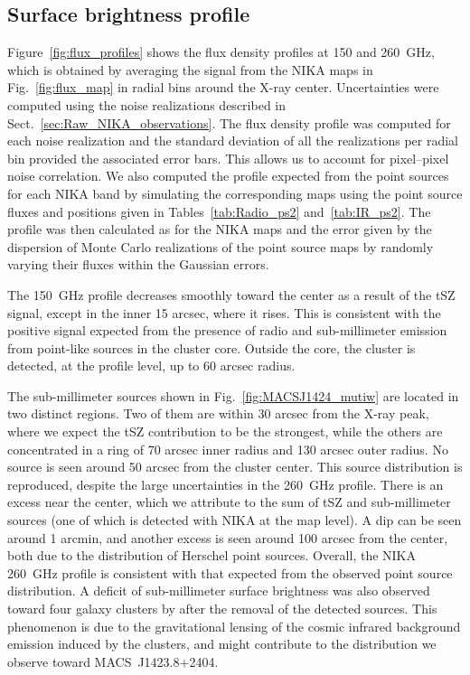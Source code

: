 \documentclass[traditabstract]{aa}
\begin{document}
\subsection{Surface brightness profile}\label{sec:surface_brightness_profiles_comparison}
Figure~\ref{fig:flux_profiles}  shows the flux density profiles at 150 and 260~GHz, which is obtained by averaging the signal from the NIKA maps in Fig.~\ref{fig:flux_map} in radial bins around the X-ray center. Uncertainties were computed  using the noise realizations described in Sect.~\ref{sec:Raw_NIKA_observations}. The flux density profile was computed for each noise realization and the standard deviation of all the realizations per radial bin provided the associated error bars. This allows us to account for pixel--pixel noise correlation. We also computed the profile expected from the point sources for each NIKA band by simulating the corresponding maps using the point source fluxes and positions given in Tables~\ref{tab:Radio_ps2} and~\ref{tab:IR_ps2}. The profile was then calculated as for the NIKA maps and the error given by the dispersion of Monte Carlo realizations of the point source maps by randomly varying their fluxes within the Gaussian errors.

The 150~GHz profile decreases smoothly toward the center as a result of the tSZ signal, except in the inner 15 arcsec, where it rises. This is consistent with the positive signal expected from the presence of radio and sub-millimeter emission from point-like sources in the cluster core. Outside the core, the cluster is detected, at the profile level, up to 60 arcsec radius. 

The sub-millimeter sources shown in Fig.~\ref{fig:MACSJ1424_mutiw} are located in two distinct regions. Two of them are within 30 arcsec from the X-ray peak, where we expect the tSZ contribution to be the strongest, while the others are concentrated in a ring of 70 arcsec inner radius and 130 arcsec outer radius. No source is seen around 50 arcsec from the cluster center. This source distribution is reproduced, despite the large uncertainties in the 260~GHz profile. There is an excess near the center, which we attribute to the sum of tSZ and sub-millimeter sources (one of  which is detected with NIKA at the map level). A dip can be  seen around 1 arcmin, and another excess is seen around 100 arcsec from the center, both due to the distribution of Herschel point sources. Overall, the NIKA 260~GHz profile is consistent with that expected from the observed point source distribution.  A deficit of sub-millimeter surface brightness was also observed toward four galaxy clusters by \cite{zemcov2013} after the removal of the detected sources. This phenomenon is due to the gravitational lensing of the cosmic infrared background emission induced by the clusters, and might contribute to the distribution we observe toward \mbox{MACS~J1423.8+2404}.
\end{document}
